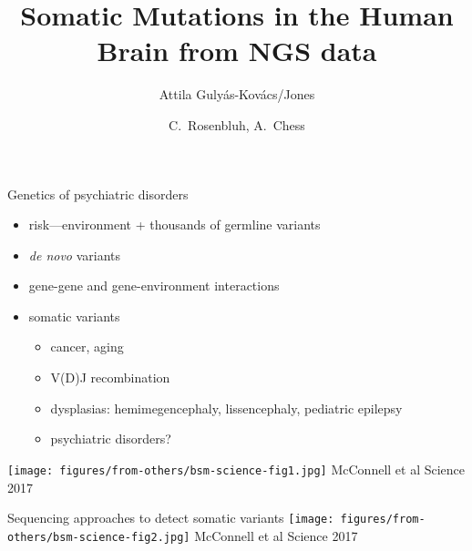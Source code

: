 \documentclass{beamer}
\title[Somatic Mutations in the Brain]{Somatic Mutations in the Human Brain from NGS data}
\author{Attila Guly\'{a}s-Kov\'{a}cs/Jones}
\date{C.~Rosenbluh, A.~Chess}
\begin{document}
\maketitle

\begin{frame}{Genetics of psychiatric disorders}
\begin{itemize}
\item risk---environment + thousands of germline variants
\item \textit{de novo} variants
\item<2-> gene-gene and gene-environment interactions  
\item<3-> somatic variants
\begin{itemize}
\item cancer, aging
\item V(D)J recombination
\item dysplasias: hemimegencephaly, lissencephaly, pediatric epilepsy 
\item<4-> \alert{psychiatric disorders?}
\end{itemize}
\end{itemize}
\end{frame}

\begin{frame}
\texttt{[image: figures/from-others/bsm-science-fig1.jpg]}
\vfill
\tiny{McConnell et al Science 2017}
\end{frame}

\begin{frame}[label=bsm-methods]{Sequencing approaches to detect somatic variants}
\texttt{[image: figures/from-others/bsm-science-fig2.jpg]}
\vfill
\tiny{McConnell et al Science 2017}
\end{frame}
\end{document}
